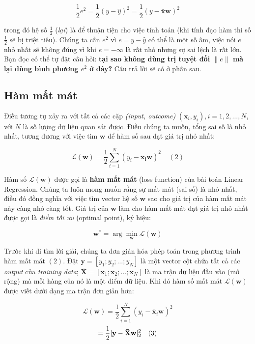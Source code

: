 $$
\frac{1}{2}e^2 = \frac{1}{2}(y - \hat{y})^2 = \frac{1}{2}(y - \mathbf{\bar{x}}\mathbf{w})^2
$$

trong đó hệ số $\frac{1}{2} $ (\textit{lại}) là để thuận tiện cho việc tính toán (khi tính đạo hàm thì số $\frac{1}{2} $ sẽ bị triệt tiêu). Chúng ta cần $e^2$ vì $e = y - \hat{y} $ có thể là một số âm, việc nói $e$ nhỏ nhất sẽ không đúng vì khi $e = - \infty$ là rất nhỏ nhưng sự sai lệch là rất lớn. Bạn đọc có thể tự đặt câu hỏi: \textbf{tại sao không dùng trị tuyệt đối $ \|e\| $ mà lại dùng bình phương $e^2$ ở đây?} Câu trả lời sẽ có ở phần sau. 






\subsection{Hàm mất mát}
Điều tương tự xảy ra với tất cả các cặp \textit{(input, outcome)} $ (\mathbf{x}_i, y_i), i = 1, 2, \dots, N $, với $N$ là số lượng dữ liệu quan sát được. Điều chúng ta muốn, tổng sai số là nhỏ nhất, tương đương với việc tìm $ \mathbf{w} $ để hàm số sau đạt giá trị nhỏ nhất:

$$ \mathcal{L}(\mathbf{w}) = \frac{1}{2}\sum_{i=1}^N (y_i - \mathbf{\bar{x}_i}\mathbf{w})^2 ~~~~~(2) $$ 

Hàm số $\mathcal{L}(\mathbf{w}) $ được gọi là \textbf{hàm mất mát} (loss function) của bài toán Linear Regression. Chúng ta luôn mong muốn rằng sự mất mát (sai số) là nhỏ nhất, điều đó đồng nghĩa với việc  tìm vector hệ số $ \mathbf{w} $  sao cho 
giá trị của hàm mất mát này càng nhỏ càng tốt. Giá trị của $\mathbf{w}$ làm cho hàm mất mát đạt giá trị nhỏ nhất được gọi là \textit{điểm tối ưu} (optimal point), ký hiệu:

$$ \mathbf{w}^* = \arg\min_{\mathbf{w}} \mathcal{L}(\mathbf{w})  $$ 

Trước khi đi tìm lời giải, chúng ta đơn giản hóa phép toán trong phương trình hàm mất mát $(2)$. Đặt $\mathbf{y} = [y_1; y_2; \dots; y_N]$ là một vector cột chứa tất cả các \textit{output} của \textit{training data}; $ \mathbf{\bar{X}} = [\mathbf{\bar{x}}_1; \mathbf{\bar{x}}_2; \dots; \mathbf{\bar{x}}_N ] $ là ma trận dữ liệu đầu vào (mở rộng) mà mỗi hàng của nó là một điểm dữ liệu. Khi đó hàm số mất mát $\mathcal{L}(\mathbf{w})$ được viết dưới dạng ma trận đơn giản hơn:

$$
\mathcal{L}(\mathbf{w}) 
= \frac{1}{2}\sum_{i=1}^N (y_i - \mathbf{\bar{x}}_i\mathbf{w})^2 $$
$$
= \frac{1}{2} \\|\mathbf{y} - \mathbf{\bar{X}}\mathbf{w} \\|_2^2 
~~~(3)
$$

